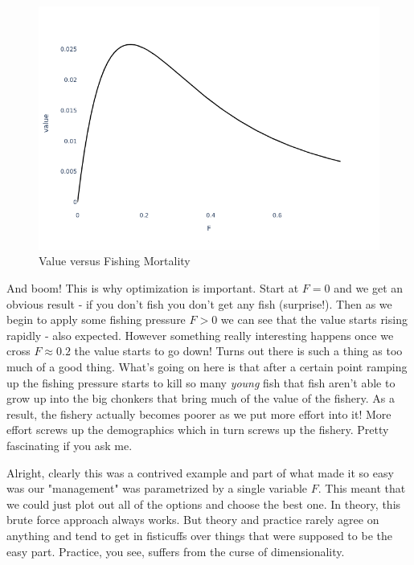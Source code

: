 \documentclass[11pt,a5paper]{book}
\begin{document}
\begin{figure}[h!] 
  \includegraphics[width=\linewidth]{notebooks/SimpleOptimization/value_v_F.png}
  \caption{Value versus Fishing Mortality}
  \label{fig:value_v_F}
\end{figure}

And boom! This is why optimization is important. Start at $F=0$ and we get an obvious result - if you don't fish you don't get any fish (surprise!). Then as we begin to apply some fishing pressure $F>0$ we can see that the value starts rising rapidly - also expected. However something really interesting happens once we cross $F\approx 0.2$ the value starts to go down! Turns out there is such a thing as too much of a good thing. What's going on here is that after a certain point ramping up the fishing pressure starts to kill so many \textit{young} fish that fish aren't able to grow up into the big chonkers that bring much of the value of the fishery. As a result, the fishery actually becomes poorer as we put more effort into it! More effort screws up the demographics which in turn screws up the fishery. Pretty fascinating if you ask me.  
\newline

Alright, clearly this was a contrived example and part of what made it so easy was our "management" was parametrized by a single variable $F$. This meant that we could just plot out all of the options and choose the best one. In theory, this brute force approach always works. But theory and practice rarely agree on anything and tend to get in fisticuffs over things that were supposed to be the easy part. Practice, you see, suffers from the curse of dimensionality. 
\newline
\end{document}
